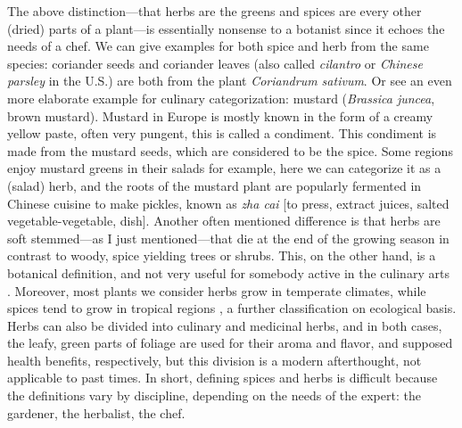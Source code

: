 The above distinction---that herbs are the greens and spices are every other (dried) parts of a plant---is essentially nonsense to a botanist since it echoes the needs of a chef. We can give examples for both spice and herb from the same species: coriander seeds and coriander leaves (also called \textit{cilantro} or \textit{Chinese parsley} in the U.S.) are both from the plant \textit{Coriandrum sativum}.
Or see an even more elaborate example for culinary categorization: mustard (\textit{Brassica juncea}, brown mustard). Mustard in Europe is mostly known in the form of a creamy yellow paste, often very pungent, this is called a condiment. This condiment is made from the mustard seeds, which are considered to be the spice. Some regions enjoy mustard greens in their salads for example, here we can categorize it as a (salad) herb, and the roots of the mustard plant are popularly fermented in Chinese cuisine to make pickles, known as  \textit{zha cai} [to press, extract juices, salted vegetable-vegetable, dish]. Another often mentioned difference is that herbs are soft stemmed---as I just mentioned---that die at the end of the growing season in contrast to woody, spice yielding trees or shrubs. This, on the other hand, is a botanical definition, and not very useful for somebody active in the culinary arts \autocite[10]{allen_herbs_2012}. Moreover, most plants we consider herbs grow in temperate climates, while spices tend to grow in tropical regions \autocite{turner_spice_2004}, a further classification on ecological basis. Herbs can also be divided into culinary and medicinal herbs, and in both cases, the leafy, green parts of foliage are used for their aroma and flavor, and supposed health benefits, respectively, but this division is a modern afterthought, not applicable to past times. In short, defining spices and herbs is difficult because the definitions vary by discipline, depending on the needs of the expert: the gardener, the herbalist, the chef. 

